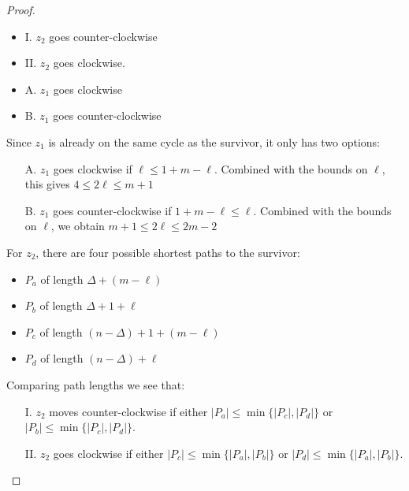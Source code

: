 \documentclass[letterpaper, 10pt]{article}
\begin{document}
\begin{proof}
\begin{proofpart}
\begin{itemize}
  \item I. $z_2$ goes counter-clockwise
  \item II. $z_2$ goes clockwise.
  \item A. $z_1$ goes clockwise
  \item B. $z_1$ goes counter-clockwise
\end{itemize}

Since $z_1$ is already on the same cycle as the survivor, it only has two options:

\begin{itemize}
\item[A.] $z_1$ goes clockwise if $\ell \leq 1 + m - \ell$.
Combined with the bounds on $\ell$, this gives $4 \leq 2 \ell \leq m + 1$

\item[B.] $z_1$ goes counter-clockwise if $1 + m - \ell \leq \ell$.
Combined with the bounds on $\ell$, we obtain $m + 1 \leq 2 \ell \leq 2m - 2$
\end{itemize}

For $z_2$, there are four possible shortest paths to the survivor:

\begin{itemize}
  \item $P_a$ of length $\Delta + (m - \ell)$
  \item $P_b$ of length $\Delta + 1 + \ell$
  \item $P_c$ of length $(n-\Delta) + 1 + (m-\ell)$
  \item $P_d$ of length $(n-\Delta) + \ell$
\end{itemize}

Comparing path lengths we see that:

\begin{itemize}
\item[I.] $z_2$ moves counter-clockwise if either $|P_a| \leq \min \{ |P_c|, |P_d| \}$ or $|P_b| \leq \min \{ |P_c|, |P_d| \}$.

\item[II.] $z_2$ goes clockwise if either $|P_c| \leq \min \{ |P_a|, |P_b| \}$ or $|P_d| \leq \min \{ |P_a|, |P_b| \}$.
\end{itemize}


\end{proofpart}
\end{proof}
\end{document}
